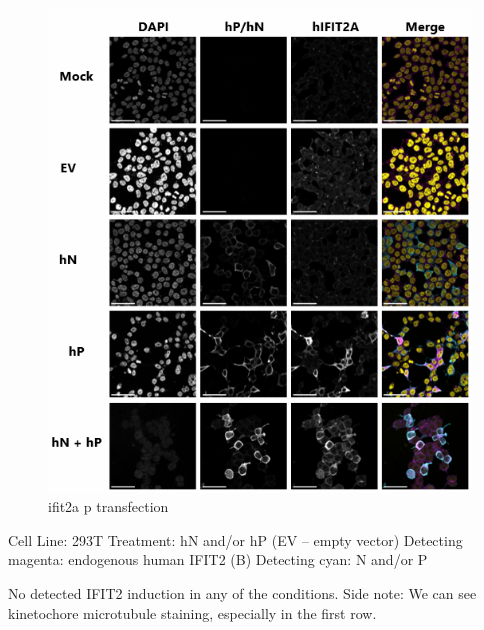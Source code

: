 \begin{figure}
    \centering
    \includegraphics[width=1\linewidth]{10. Chapter 5//Figs//04. IFIT2AB Discussion/03. ifit2a p transfection.png}
    \caption[ifit2a p transfection]{ifit2a p transfection}
    \label{fig:ifit2a p transfection}
\end{figure}

Cell Line: 293T \newline
Treatment: hN and/or hP (EV – empty vector) \newline
Detecting magenta: endogenous human IFIT2 (B) \newline
Detecting cyan: N and/or P \newline

No detected IFIT2 induction in any of the conditions.
Side note: We can see kinetochore microtubule staining, especially in the first row.


